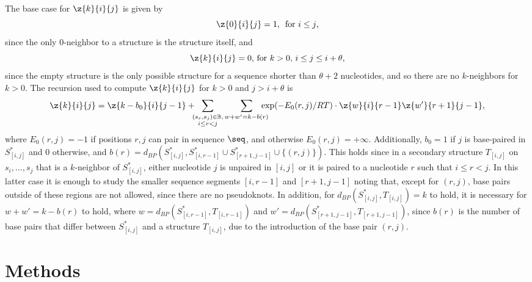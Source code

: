 The base case for $\z{k}{i}{j}$ is given by
\begin{equation}
  \z{0}{i}{j} = 1,\, \mbox{ for $i \le j$,}
  \label{eq:Zinit1}
\end{equation}
since the only $0$-neighbor to a structure \strSt
is the structure \strSt itself, and
\begin{equation}
  \z{k}{i}{j} = 0,\, \mbox{for $k > 0$, $i \le j \leq
    i+\theta$},
  \label{eq:Zinit2}
\end{equation}
since the empty structure is the only possible structure for a
sequence shorter than $\theta + 2$ nucleotides, and so there are no
$k$-neighbors for $k>0$. The recursion used to compute
$\z{k}{i}{j}$ for $k > 0$ and $j > i+\theta$ is
\begin{equation}
  \z{k}{i}{j} = \z{k -b_0}{i}{j-1} +
  \hspace{-5pt} \sum_{\substack{ (s_r,s_j) \in \mathbb{B}, \\
  i \leq r < j }} \sum_{w+w'=k - b(r)} \hspace{-10pt}
  \exp(-E_0(r,j)/RT) \cdot \z{w}{i}{r-1} \z{w'}{r+1}{j-1},
  \label{eq:N}
\end{equation}
where $E_0(r,j) = -1$ if positions $r,j$ can pair in sequence $\seq$,
and otherwise $E_0(r,j) = +\infty$. Additionally,
$b_0 = 1$ if $j$ is base-paired
in $S^*_{[i,j]}$ and $0$ otherwise, and
$b(r)=d_{BP}(S^*_{[i,j]}, S^*_{[i,r-1]} \cup S^*_{[r+1,j-1]} \cup\{(r,j)\})$.
This holds since in a secondary
structure $T_{[i,j]}$ on $s_i,\ldots,s_j$ that is a $k$-neighbor of
$S^*_{[i,j]}$,
either nucleotide $j$ is unpaired in $[i,j]$ or it is
paired to a nucleotide $r$ such that $i \leq r < j$. In this
latter case it is enough to study the smaller sequence segments
$[i,r-1]$ and $[r+1,j-1]$ noting that, except for $(r,j)$,
base pairs outside of these regions are not allowed, since there
are no pseudoknots. In addition,
for $d_{BP}(S^*_{[i,j]},T_{[i,j]}) = k$ to hold,
it is necessary for $w+w' = k -b(r)$ to hold, where $w =
d_{BP}(S^*_{[i,r-1]},T_{[i,r-1]})$ and $w' =
d_{BP}(S^*_{[r+1,j-1]},T_{[r+1,j-1]})$, since $b(r)$ is the
number of base pairs that differ between $S^*_{[i,j]}$ and a
structure $T_{[i,j]}$, due to the introduction of the base pair
$(r,j)$.

\section*{Methods}

